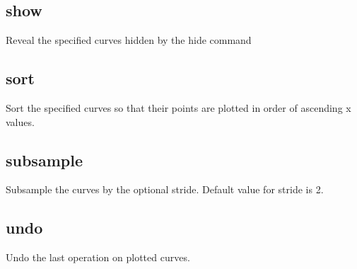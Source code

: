 \documentclass[letterpaper,10pt,english]{sphinxmanual}
\begin{document}
\subsection{show}
\label{\detokenize{curve_control_cmds:show}}
Reveal the specified curves hidden by the hide command

\begin{sphinxVerbatim}[commandchars=\\\{\}]
\PYG{p}{[}\PYG{p}{]}  
\end{sphinxVerbatim}


\subsection{sort}
\label{\detokenize{curve_control_cmds:sort}}
Sort the specified curves so that their points are plotted in order of ascending x values.

\begin{sphinxVerbatim}[commandchars=\\\{\}]
\PYG{p}{[}\PYG{p}{]}  
\end{sphinxVerbatim}


\subsection{subsample}
\label{\detokenize{curve_control_cmds:subsample}}
Subsample the curves by the optional stride. Default value for stride is 2.

\begin{sphinxVerbatim}[commandchars=\\\{\}]
\PYG{p}{[}\PYG{p}{]}   \PYG{p}{[}\PYG{p}{]}
\end{sphinxVerbatim}


\subsection{undo}
\label{\detokenize{curve_control_cmds:undo}}
Undo the last operation on plotted curves.

\begin{sphinxVerbatim}[commandchars=\\\{\}]
\PYG{p}{[}\PYG{p}{]} 
\end{sphinxVerbatim}
\end{document}
